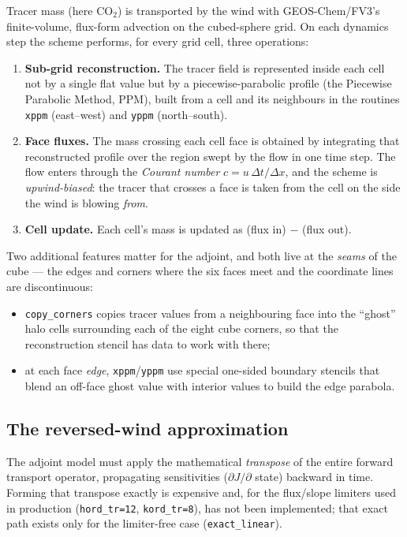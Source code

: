 \documentclass[11pt]{article}
\newcommand{\code}[1]{\texttt{#1}}
\begin{document}
Tracer mass (here CO$_2$) is transported by the wind with GEOS-Chem/FV3's
finite-volume, flux-form advection on the cubed-sphere grid. On each dynamics
step the scheme performs, for every grid cell, three operations:
\begin{enumerate}
  \item \textbf{Sub-grid reconstruction.} The tracer field is represented inside
  each cell not by a single flat value but by a piecewise-parabolic profile
  (the Piecewise Parabolic Method, PPM), built from a cell and its neighbours in
  the routines \code{xppm} (east--west) and \code{yppm} (north--south).
  \item \textbf{Face fluxes.} The mass crossing each cell face is obtained by
  integrating that reconstructed profile over the region swept by the flow in
  one time step. The flow enters through the \emph{Courant number}
  $c=u\,\Delta t/\Delta x$, and the scheme is \emph{upwind-biased}: the tracer
  that crosses a face is taken from the cell on the side the wind is blowing
  \emph{from}.
  \item \textbf{Cell update.} Each cell's mass is updated as (flux in)
  $-$ (flux out).
\end{enumerate}

Two additional features matter for the adjoint, and both live at the
\emph{seams} of the cube --- the edges and corners where the six faces meet and
the coordinate lines are discontinuous:
\begin{itemize}
  \item \code{copy\_corners} copies tracer values from a neighbouring face into
  the ``ghost'' halo cells surrounding each of the eight cube corners, so that
  the reconstruction stencil has data to work with there;
  \item at each face \emph{edge}, \code{xppm}/\code{yppm} use special one-sided
  boundary stencils that blend an off-face ghost value with interior values to
  build the edge parabola.
\end{itemize}

\subsection{The reversed-wind approximation}

The adjoint model must apply the mathematical \emph{transpose} of the entire
forward transport operator, propagating sensitivities ($\partial J/\partial$
state) backward in time. Forming that transpose exactly is expensive and, for
the flux/slope limiters used in production (\code{hord\_tr=12}, \code{kord\_tr=8}),
has not been implemented; that exact path exists only for the limiter-free case
(\code{exact\_linear}).
\end{document}

